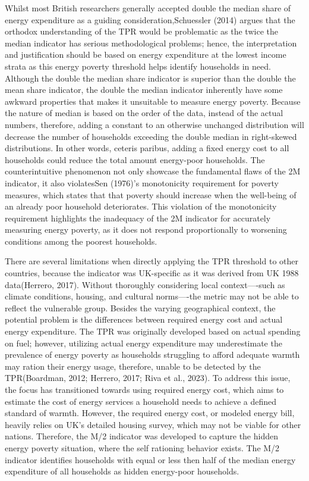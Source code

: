 \documentclass[
  twoside,
  openright,
  degree    = master,               %
  language  = english,              %
  fontset   = overleaf,             %
  watermark = true,                 %
  doi       = true,                 %
]{ntuthesis}
\begin{document}
Whilst most British researchers generally accepted double the median
share of energy expenditure as a guiding consideration,Schuessler (2014)
argues that the orthodox understanding of the TPR would be problematic
as the twice the median indicator has serious methodological problems;
hence, the interpretation and justification should be based on energy
expenditure at the lowest income strata as this energy poverty threshold
helps identify households in need. Although the double the median share
indicator is superior than the double the mean share indicator, the
double the median indicator inherently have some awkward properties that
makes it unsuitable to measure energy poverty. Because the nature of
median is based on the order of the data, instead of the actual numbers,
therefore, adding a constant to an otherwise unchanged distribution will
decrease the number of households exceeding the double median in
right-skewed distributions. In other words, ceteris paribus, adding a
fixed energy cost to all households could reduce the total amount
energy-poor households. The counterintuitive phenomenon not only
showcase the fundamental flaws of the 2M indicator, it also violatesSen
(1976)'s monotonicity requirement for poverty measures, which states
that that poverty should increase when the well-being of an already poor
household deteriorates. This violation of the monotonicity requirement
highlights the inadequacy of the 2M indicator for accurately measuring
energy poverty, as it does not respond proportionally to worsening
conditions among the poorest households.

There are several limitations when directly applying the TPR threshold
to other countries, because the indicator was UK-specific as it was
derived from UK 1988 data(Herrero, 2017). Without thoroughly considering
local context----such as climate conditions, housing, and cultural
norms----the metric may not be able to reflect the vulnerable group.
Besides the varying geographical context, the potential problem is the
differences between required energy cost and actual energy expenditure.
The TPR was originally developed based on actual spending on fuel;
however, utilizing actual energy expenditure may underestimate the
prevalence of energy poverty as households struggling to afford adequate
warmth may ration their energy usage, therefore, unable to be detected
by the TPR(Boardman, 2012; Herrero, 2017; Riva et al., 2023). To address
this issue, the focus has transitioned towards using required energy
cost, which aims to estimate the cost of energy services a household
needs to achieve a defined standard of warmth. However, the required
energy cost, or modeled energy bill, heavily relies on UK's detailed
housing survey, which may not be viable for other nations. Therefore,
the M/2 indicator was developed to capture the hidden energy poverty
situation, where the self rationing behavior exists. The M/2 indicator
identifies households with equal or less then half of the median energy
expenditure of all households as hidden energy-poor households.
\end{document}
